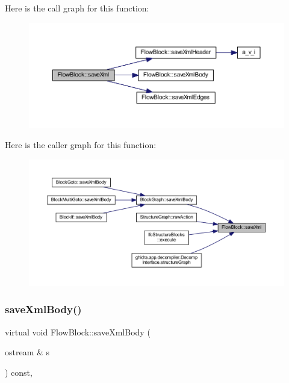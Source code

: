 Here is the call graph for this function\+:
\nopagebreak
\begin{figure}[H]
\begin{center}
\leavevmode
\includegraphics[width=350pt]{class_flow_block_a91d4573992c7a798259b34be67d97d5a_cgraph}
\end{center}
\end{figure}
Here is the caller graph for this function\+:
\nopagebreak
\begin{figure}[H]
\begin{center}
\leavevmode
\includegraphics[width=350pt]{class_flow_block_a91d4573992c7a798259b34be67d97d5a_icgraph}
\end{center}
\end{figure}
\mbox{\label{class_flow_block_a05d5939fe8f00edba7320799bf3f177b}} 
\subsubsection{\texorpdfstring{saveXmlBody()}{saveXmlBody()}}
{\footnotesize\ttfamily virtual void Flow\+Block\+::save\+Xml\+Body (\begin{DoxyParamCaption}\item[{ostream \&}]{s }\end{DoxyParamCaption}) const\hspace{0.3cm}{\ttfamily [inline]}, {\ttfamily [virtual]}}



